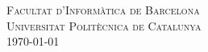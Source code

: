 \begin{titlepage}
\textsc{\LARGE Facultat d'Informàtica de Barcelona}\\[0.5cm]
\textsc{\Large Universitat Politècnica de Catalunya}\\[0.5cm] %



{\large \today}\\[3cm] %


 

\vfill %

\end{titlepage}
